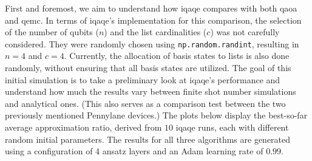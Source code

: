 First and foremost, we aim to understand how \acrshort{iqaqe} compares with both \acrshort{qaoa} and \acrshort{qemc}. In terms of \acrshort{iqaqe}'s implementation for this comparison, the selection of the number of qubits ($n$) and the list cardinalities ($c$) was not carefully considered. They were randomly chosen using \texttt{np.random.randint}, resulting in $n = 4$ and $c = 4$. Currently, the allocation of basis states to lists is also done randomly, without ensuring that all basis states are utilized. The goal of this initial simulation is to take a preliminary look at \acrshort{iqaqe}'s performance and understand how much the results vary between finite shot number simulations and analytical ones. (This also serves as a comparison test between the two previously mentioned Pennylane devices.) The plots below display the best-so-far average approximation ratio, derived from $10$ \acrshort{iqaqe} runs, each with different random initial parameters. The results for all three algorithms are generated using a configuration of $4$ ansatz layers and an Adam learning rate of $0.99$.

